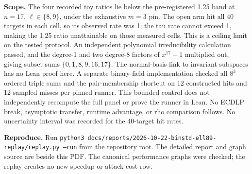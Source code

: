\documentclass[10pt]{article}
\begin{document}
\textbf{Scope.} The four recorded toy ratios lie below the pre-registered
1.25 band at $n=17$, $\ell\in\{8,9\}$, under the exhaustive $m=3$ pin.
The open arm hit all 40 targets in each cell, so its observed rate was 1;
the tau rate cannot exceed 1, making the 1.25 ratio unattainable on those
measured cells. This is a ceiling limit on the tested protocol.
An independent polynomial irreducibility calculation passed, and the
degree-1 and two degree-8 factors of $x^{17}-1$ multiplied out, giving
subset sums $\{0,1,8,9,16,17\}$. The normal-basis link to invariant
subspaces has no Lean proof here. A separate binary-field implementation
checked all $8^3$ ordered triple sums and the pair-membership shortcut on
12 constructed hits and 12 sampled misses per pinned runner. This bounded
control does not independently recompute the full panel or prove the runner
in Lean. No ECDLP
break, asymptotic transfer, runtime advantage, or rho comparison follows.
No uncertainty interval was recorded for the 40-target hit rates.

\textbf{Reproduce.} Run \texttt{python3 docs/reports/2026-10-22-binstd-ell89-replay/replay.py --run}
from the repository root. The detailed report and graph source are beside
this PDF. The canonical performance graphs were checked; the replay creates
no new speedup or attack-cost row.
\end{document}
